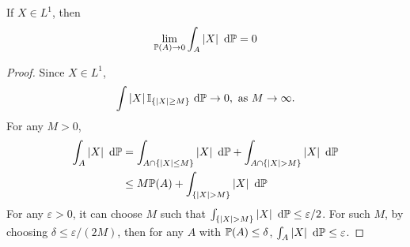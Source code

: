 \begin{lem}
    If $X \in L^1$, then
    \begin{equation*}
        \lim_{\mathbb{P}\left(A\right) \rightarrow 0} \int_A \left\lvert X\right\lvert~\mathrm{d}\mathbb{P} = 0
    \end{equation*}
\end{lem}
\begin{proof}
    Since $X \in L^1$,
    \begin{equation*}
        \int \left\lvert X\right\lvert\mathbb{I}_{\left\{\left\lvert X\right\lvert \geq M\right\}} ~\mathrm{d}\mathbb{P} \rightarrow 0,\text{ as } M \rightarrow \infty.
    \end{equation*}
    For any $M > 0$,
    \begin{equation*}
        \begin{aligned}
            \int_A \left\lvert X\right\lvert~\mathrm{d}\mathbb{P} &= \int_{A \cap \left\{\left\lvert X\right\lvert \leq M\right\}} \left\lvert X\right\lvert~\mathrm{d}\mathbb{P} + \int_{A \cap \left\{\left\lvert X\right\lvert > M\right\}} \left\lvert X\right\lvert~\mathrm{d}\mathbb{P} \\
            &\leq M\mathbb{P}(A) + \int_{\left\{\left\lvert X\right\lvert > M\right\}} \left\lvert X\right\lvert~\mathrm{d}\mathbb{P}
        \end{aligned}
    \end{equation*}
    For any $\varepsilon > 0$, it can choose $M$ such that $\int_{\left\{\left\lvert X\right\lvert > M\right\}} \left\lvert X\right\lvert~\mathrm{d}\mathbb{P} \leq \varepsilon / 2$. For such $M$, by choosing $\delta \leq \varepsilon / (2M)$, then for any $A$ with $\mathbb{P}(A) \leq \delta$, $\int_A \left\lvert X\right\lvert~\mathrm{d}\mathbb{P} \leq \varepsilon$. \qedhere
\end{proof}

